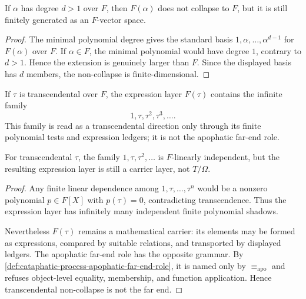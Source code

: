 \begin{theorem}
\label{thm:algebraic-noncollapse-finite-dimensional}
If $\alpha$ has degree $d>1$ over $F$, then $F(\alpha)$ does not collapse to
$F$, but it is still finitely generated as an $F$-vector space.
\end{theorem}

\begin{proof}
The minimal polynomial degree gives the standard basis
$1,\alpha,\ldots,\alpha^{d-1}$ for $F(\alpha)$ over $F$.  If
$\alpha\in F$, the minimal polynomial would have degree $1$, contrary to
$d>1$.  Hence the extension is genuinely larger than $F$.  Since the
displayed basis has $d$ members, the non-collapse is finite-dimensional.
\end{proof}

\begin{definition}
\label{def:transcendental-direction}
If $\tau$ is transcendental over $F$, the expression layer $F(\tau)$ contains
the infinite family
$$
1,\tau,\tau^2,\tau^3,\ldots .
$$
This family is read as a transcendental direction only through its finite
polynomial tests and expression ledgers; it is not the apophatic far-end
role.
\end{definition}

\begin{theorem}
\label{thm:transcendental-noncollapse-not-far-end}
For transcendental $\tau$, the family
$1,\tau,\tau^2,\ldots$ is $F$-linearly independent, but the resulting
expression layer is still a carrier layer, not $T/\Omega$.
\end{theorem}

\begin{proof}
Any finite linear dependence among $1,\tau,\ldots,\tau^n$ would be a nonzero
polynomial $p\in F[X]$ with $p(\tau)=0$, contradicting transcendence.  Thus
the expression layer has infinitely many independent finite polynomial
shadows.

Nevertheless $F(\tau)$ remains a mathematical carrier: its elements may be
formed as expressions, compared by suitable relations, and transported by
displayed ledgers.  The apophatic far-end role has the opposite grammar.  By
\autoref{def:cataphatic-process-apophatic-far-end-role}, it is named only by
$\equiv_{\mathrm{apo}}$ and refuses object-level equality, membership, and
function application.  Hence transcendental non-collapse is not the far end.
\end{proof}

